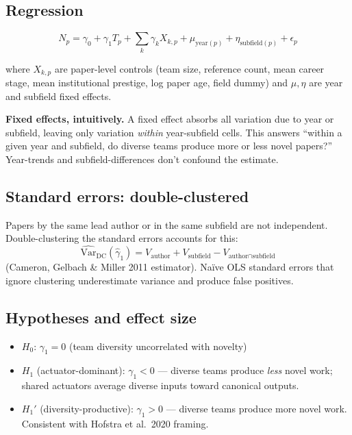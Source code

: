 \documentclass[11pt]{article}
\begin{document}
\subsection{Regression}

\[
  N_p = \gamma_0 + \gamma_1 T_p + \sum_k \gamma_k X_{k,p}
  + \mu_{\text{year}(p)} + \eta_{\text{subfield}(p)} + \epsilon_p
\]

where $X_{k,p}$ are paper-level controls (team size, reference count,
mean career stage, mean institutional prestige, log paper age, field
dummy) and $\mu, \eta$ are year and subfield fixed effects.

\textbf{Fixed effects, intuitively.} A fixed effect absorbs all
variation due to year or subfield, leaving only variation
\textit{within} year-subfield cells. This answers ``within a given year
and subfield, do diverse teams produce more or less novel papers?''
Year-trends and subfield-differences don't confound the estimate.

\subsection{Standard errors: double-clustered}

Papers by the same lead author or in the same subfield are not
independent. Double-clustering the standard errors accounts for this:
\[
  \widehat{\text{Var}}_{\text{DC}}(\hat \gamma_1) =
  V_{\text{author}} + V_{\text{subfield}} - V_{\text{author} \cap
  \text{subfield}}
\]
(Cameron, Gelbach \& Miller 2011 estimator). Naïve OLS standard errors
that ignore clustering underestimate variance and produce false
positives.

\subsection{Hypotheses and effect size}

\begin{itemize}[nosep]
  \item $H_0$: $\gamma_1 = 0$ (team diversity uncorrelated with novelty)
  \item $H_1$ (actuator-dominant): $\gamma_1 < 0$ --- diverse teams
    produce \textit{less} novel work; shared actuators average diverse
    inputs toward canonical outputs.
  \item $H_1'$ (diversity-productive): $\gamma_1 > 0$ --- diverse teams
    produce more novel work. Consistent with Hofstra et al.~2020
    framing.
\end{itemize}
\end{document}
